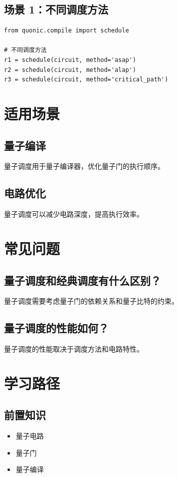 \documentclass[12pt,a4paper]{article}
\begin{document}
\subsection{场景 1：不同调度方法}

\begin{verbatim}
from quonic.compile import schedule

# 不同调度方法
r1 = schedule(circuit, method='asap')
r2 = schedule(circuit, method='alap')
r3 = schedule(circuit, method='critical_path')
\end{verbatim}

\section{适用场景}

\subsection{量子编译}

量子调度用于量子编译器，优化量子门的执行顺序。

\subsection{电路优化}

量子调度可以减少电路深度，提高执行效率。

\section{常见问题}

\subsection{量子调度和经典调度有什么区别？}

量子调度需要考虑量子门的依赖关系和量子比特的约束。

\subsection{量子调度的性能如何？}

量子调度的性能取决于调度方法和电路特性。

\section{学习路径}

\subsection{前置知识}
\begin{itemize}
  \item 量子电路
  \item 量子门
  \item 量子编译
\end{itemize}
\end{document}
